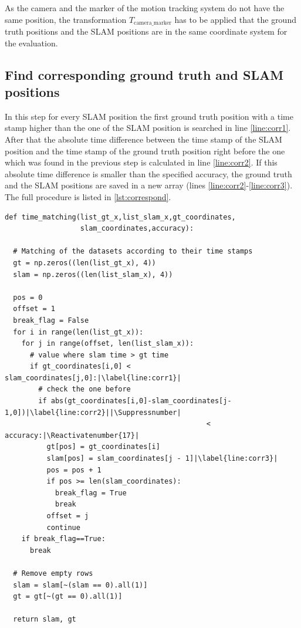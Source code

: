As the camera and the marker of the motion tracking system do not have the same position, the transformation $T_{\text{camera\_marker}}$ has to be applied that the ground truth positions and the \ac{SLAM} positions are in the same coordinate system for the evaluation.

\subsection{Find corresponding ground truth and \ac{SLAM} positions}
In this step for every \ac{SLAM} position the first ground truth position with a time stamp higher than the one of the \ac{SLAM} position is searched in line \autoref{line:corr1}. After that the absolute time difference between the time stamp of the \ac{SLAM} position and the time stamp of the ground truth position right before the one which was found in the previous step is calculated in line \autoref{line:corr2}. If this absolute time difference is smaller than the specified accuracy, the ground truth and the \ac{SLAM} positions are saved in a new array (lines \autoref{line:corr2}-\autoref{line:corr3}). The full procedure is listed in \autoref{lst:correspond}.

\lstset{language=Python}
\begin{lstlisting}[frame=single, caption=Find corresponding positions in time, label=lst:correspond]
def time_matching(list_gt_x,list_slam_x,gt_coordinates,
                  slam_coordinates,accuracy):

  # Matching of the datasets according to their time stamps
  gt = np.zeros((len(list_gt_x), 4))
  slam = np.zeros((len(list_slam_x), 4))

  pos = 0
  offset = 1
  break_flag = False
  for i in range(len(list_gt_x)):
    for j in range(offset, len(list_slam_x)):
      # value where slam time > gt time
      if gt_coordinates[i,0] < slam_coordinates[j,0]:|\label{line:corr1}|
        # check the one before
        if abs(gt_coordinates[i,0]-slam_coordinates[j-1,0])|\label{line:corr2}||\Suppressnumber|
                                                < accuracy:|\Reactivatenumber{17}|
          gt[pos] = gt_coordinates[i]
          slam[pos] = slam_coordinates[j - 1]|\label{line:corr3}|
          pos = pos + 1
          if pos >= len(slam_coordinates):
            break_flag = True
            break
          offset = j
          continue
    if break_flag==True:
      break

  # Remove empty rows
  slam = slam[~(slam == 0).all(1)]
  gt = gt[~(gt == 0).all(1)]

  return slam, gt
\end{lstlisting}

